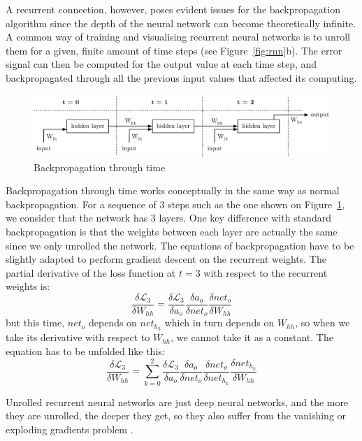 A recurrent connection, however, poses evident issues for the backpropagation
algorithm since the depth of the neural network can become theoretically
infinite.  A common way of training and visualising recurrent neural networks 
is to unroll them for a given, finite amount of time steps (see 
Figure~\ref{fig:rnn}b).  The error signal can then be computed
for the output value at each time step, and backpropagated through all the
previous input values that affected its computing.\\

\begin{figure}[H]
	\centering
	\includegraphics[width=0.8\linewidth]{fig/bptt.eps}
	\caption{Backpropagation through time}
	\label{fig:bptt}
\end{figure}


Backpropagation through time \cite{bptt} works conceptually in the same way
as normal backpropagation. For a sequence of 3 steps such as the one shown
on Figure~\ref{fig:bptt}, we consider that the network has 3 layers. 
One key difference with standard backpropagation is that the weights
between each layer are actually the same since we only unrolled the network.
The equations of backpropagation have to be slightly adapted to perform
gradient descent on the recurrent weights. The partial derivative of the
loss function at $t=3$ with respect to the recurrent weights is:
\begin{equation}
	\frac{\delta\mathcal{L}_3}{\delta W_{hh}} = 
\frac{\delta\mathcal{L}_3}{\delta a_o}
\frac{\delta a_o}{\delta net_o}
\frac{\delta net_o}{\delta W_{hh}}
	\label{eq:chainrule_bptt}
\end{equation}
but this time, $net_o$ depends on $net_{h_3}$ which in turn depends on $W_{hh}$, so
when we take its derivative with respect to $W_{hh}$, we cannot take it as
a constant. The equation has to be unfolded like this:
\begin{equation}
	\frac{\delta\mathcal{L}_3}{\delta W_{hh}} = 
	\sum\limits_{k=0}^2
\frac{\delta\mathcal{L}_3}{\delta a_o}
\frac{\delta a_o}{\delta net_o}
\frac{\delta net_o}{\delta net_{h_k}}
	\frac{\delta net_{h_k}}{\delta W_{hh}}
\end{equation}

Unrolled recurrent neural networks are just deep neural networks, and the
more they are unrolled, the deeper they get, so they also suffer from
the vanishing or exploding gradients problem \cite{vanishing_gradient_rnn, 
bengio94}.


